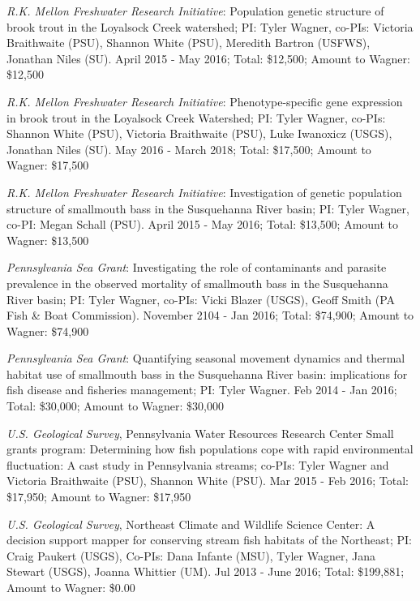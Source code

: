 \documentclass[10pt]{article}
\begin{document}
\begin{flushleft}
\begin{etaremune}
\item {\sl  R.K. Mellon Freshwater Research Initiative}: Population genetic structure of brook trout in the Loyalsock Creek watershed; PI: Tyler Wagner, co-PIs: Victoria Braithwaite (PSU), Shannon White (PSU), Meredith Bartron (USFWS), Jonathan Niles (SU). April 2015 - May 2016; Total: \$12,500; Amount to Wagner: \$12,500

\item {\sl  R.K. Mellon Freshwater Research Initiative}: Phenotype-specific gene expression in brook trout in the Loyalsock Creek Watershed; PI: Tyler Wagner, co-PIs: Shannon White (PSU), Victoria Braithwaite (PSU), Luke Iwanoxicz (USGS), Jonathan Niles (SU). May 2016 - March 2018; Total: \$17,500; Amount to Wagner: \$17,500

\item {\sl  R.K. Mellon Freshwater Research Initiative}: Investigation of genetic population structure of smallmouth bass in the Susquehanna River basin; PI: Tyler Wagner, co-PI: Megan Schall (PSU). April 2015 - May 2016; Total: \$13,500; Amount to Wagner: \$13,500

\item {\sl Pennsylvania Sea Grant}: Investigating the role of contaminants and parasite prevalence in the observed mortality of smallmouth bass in the Susquehanna River basin; PI: Tyler Wagner, co-PIs: Vicki Blazer (USGS), Geoff Smith (PA Fish \& Boat Commission). November 2104 - Jan 2016; Total: \$74,900; Amount to Wagner: \$74,900

\item {\sl Pennsylvania Sea Grant}: Quantifying seasonal movement dynamics and thermal habitat use of smallmouth bass in the Susquehanna River basin: implications for fish disease and fisheries management; PI: Tyler Wagner. Feb 2014 - Jan 2016; Total: \$30,000; Amount to Wagner: \$30,000

\item {\sl U.S. Geological Survey}, Pennsylvania Water Resources Research Center Small grants program: Determining how fish populations cope with rapid environmental fluctuation: A cast study in Pennsylvania streams; co-PIs: Tyler Wagner and Victoria Braithwaite (PSU), Shannon White (PSU). Mar 2015 - Feb 2016; Total: \$17,950; Amount to Wagner: \$17,950

\item {\sl U.S. Geological Survey}, Northeast Climate and Wildlife Science Center: A decision support mapper for conserving stream fish habitats of the Northeast; PI: Craig Paukert (USGS), Co-PIs: Dana Infante (MSU), Tyler Wagner, Jana Stewart (USGS), Joanna Whittier (UM). Jul 2013 - June 2016; Total: \$199,881; Amount to Wagner: \$0.00


\end{etaremune}
\end{flushleft}
\end{document}
